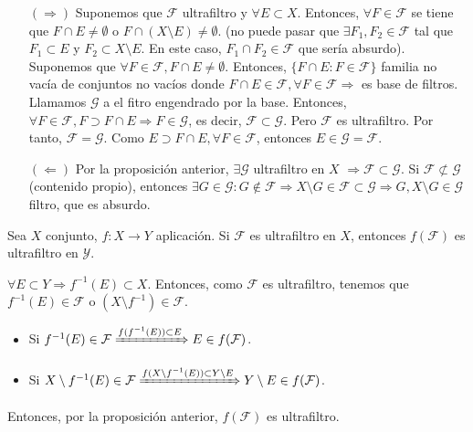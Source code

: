\begin{dem}
  \begin{enumerate}[label=(\roman*)]
    \item []
    \item [$(\Rightarrow)$] Suponemos que $\mathcal{F}$ ultrafiltro y $\forall E \subset X$. Entonces, $\forall F \in \mathcal{F}$ se tiene que $F \cap E \neq \emptyset$ o $F \cap (X \setminus E) \neq \emptyset$. (no puede pasar que $\exists F_{1}, F_{2} \in \mathcal{F}$ tal que $F_{1} \subset E$ y $F_{2} \subset X \setminus E$. En este caso, $F_{1} \cap F_{2} \in \mathcal{F}$ que sería absurdo). Suponemos que $\forall F \in \mathcal{F}, F \cap E \neq \emptyset$. Entonces, $\{ F \cap E : F \in \mathcal{F} \}$ familia no vacía de conjuntos no vacíos donde $F \cap E \in \mathcal{F}, \forall F \in \mathcal{F} \Rightarrow $ es base de filtros. Llamamos $\mathcal{G}$ a el fitro engendrado por la base. Entonces, $\forall F \in \mathcal{F}, F \supset F \cap E \Rightarrow F \in \mathcal{G}$, es decir, $\mathcal{F} \subset \mathcal{G}$. Pero $\mathcal{F}$ es ultrafiltro. Por tanto, $\mathcal{F} = \mathcal{G}$. Como $E \supset F \cap E, \forall F \in \mathcal{F}$, entonces $E \in \mathcal{G} = \mathcal{F}$.
    \item [$(\Leftarrow)$] Por la proposición anterior, $\exists \mathcal{G}$ ultrafiltro en $X$ $\Rightarrow \mathcal{F} \subset \mathcal{G}$. Si $\mathcal{F} \not \subset \mathcal{G}$(contenido propio), entonces $\exists G \in \mathcal{G}: G \not \in \mathcal{F} \Rightarrow X \setminus G \in \mathcal{F} \subset \mathcal{G} \Rightarrow G, X \setminus G \in \mathcal{G}$ filtro, que es absurdo.
  \end{enumerate}
\end{dem}

\begin{prop}
  Sea $X$ conjunto, $f : X \to Y$ aplicación. Si $\mathcal{F}$ es ultrafiltro en $X$, entonces $f(\mathcal{F})$ es ultrafiltro en $\mathcal{Y}$.
\end{prop}

\begin{dem}
  $\forall E \subset Y \Rightarrow f^{-1}(E) \subset X$. Entonces, como $\mathcal{F}$ es ultrafiltro, tenemos que $f^{-1}(E) \in \mathcal{F}$ o $(X \setminus f^{-1}) \in \mathcal{F}$.
  \begin{itemize}
    \item Si $f^{-1}(E) \in \mathcal{F} \xRightarrow[]{ f(f^{-1}(E)) \subset E } E \in f(\mathcal{F})$.
    \item Si $X \setminus f^{-1}(E) \in \mathcal{F} \xRightarrow[]{ f(X \setminus f^{-1}(E)) \subset Y \setminus E } Y \setminus E \in f(\mathcal{F})$.
  \end{itemize}
  Entonces, por la proposición anterior, $f(\mathcal{F})$ es ultrafiltro.
\end{dem}

